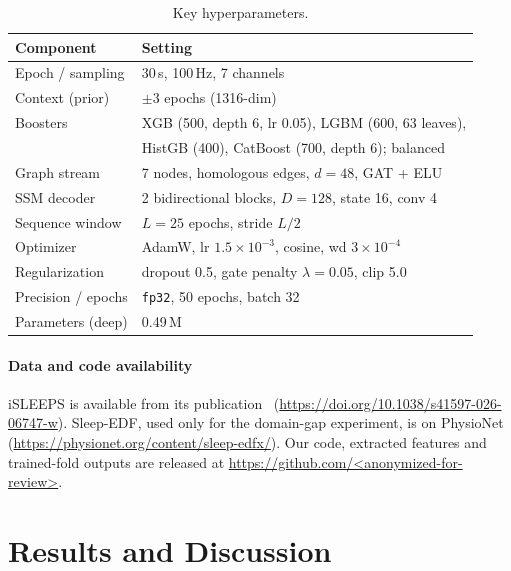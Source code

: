 \documentclass[journal]{IEEEtran}
\begin{document}
\begin{table}[t]
\caption{Key hyperparameters.}
\label{tab:hyper}
\centering
\setlength{\tabcolsep}{4pt}
\begin{tabular}{ll}
\toprule
Component & Setting \\
\midrule
Epoch / sampling & 30\,s, 100\,Hz, 7 channels \\
Context (prior) & $\pm3$ epochs (1316-dim) \\
Boosters & XGB (500, depth 6, lr 0.05), LGBM (600, 63 leaves), \\
         & HistGB (400), CatBoost (700, depth 6); balanced \\
Graph stream & 7 nodes, homologous edges, $d\!=\!48$, GAT + ELU \\
SSM decoder & 2 bidirectional blocks, $D\!=\!128$, state 16, conv 4 \\
Sequence window & $L\!=\!25$ epochs, stride $L/2$ \\
Optimizer & AdamW, lr $1.5\!\times\!10^{-3}$, cosine, wd $3\!\times\!10^{-4}$ \\
Regularization & dropout 0.5, gate penalty $\lambda\!=\!0.05$, clip 5.0 \\
Precision / epochs & \texttt{fp32}, 50 epochs, batch 32 \\
Parameters (deep) & 0.49\,M \\
\bottomrule
\end{tabular}
\end{table}

\paragraph{Data and code availability}
iSLEEPS is available from its publication~\cite{maiti2026isleeps}
(\url{https://doi.org/10.1038/s41597-026-06747-w}). Sleep-EDF, used only for the
domain-gap experiment, is on PhysioNet~\cite{kemp2000sleepedf,goldberger2000physionet}
(\url{https://physionet.org/content/sleep-edfx/}). Our code, extracted features and
trained-fold outputs are released at
\url{https://github.com/<anonymized-for-review>}.

\section{Results and Discussion}
\label{sec:results}
\end{document}
